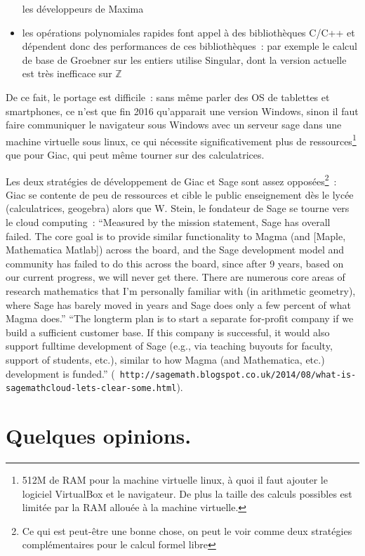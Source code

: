 \documentclass[a4paper,11pt]{article}
\begin{document}
\begin{giacjshere}
\begin{itemize}
les d\'eveloppeurs de Maxima
\item
les op\'erations polynomiales rapides font appel \`a des
biblioth\`eques C/C++ et d\'ependent donc des performances
de ces biblioth\`eques~: par exemple le calcul de base
de Groebner sur les entiers utilise Singular, dont la version
actuelle est tr\`es inefficace sur $\mathbb{Z}$
\end{itemize} 
De ce fait, le portage est difficile~: sans m\^eme parler des OS de tablettes
et smartphones, ce n'est que fin 2016 qu'apparait une version 
Windows, sinon il faut faire communiquer le navigateur sous Windows 
avec un serveur sage dans une machine virtuelle sous linux, ce qui n\'ecessite
significativement plus de ressources\footnote{512M de RAM pour la
machine virtuelle linux, \`a quoi il faut ajouter 
le logiciel VirtualBox et le navigateur. De plus la taille des
calculs possibles est limit\'ee par la RAM allou\'ee \`a
la machine virtuelle.} que pour Giac, 
qui peut m\^eme tourner sur des calculatrices.

Les deux strat\'egies de d\'eveloppement de Giac et Sage
sont assez oppos\'ees\footnote{Ce qui est peut-\^etre une bonne chose,
on peut le voir comme deux strat\'egies compl\'ementaires pour le
calcul formel libre}~: Giac se contente de peu de ressources et cible le 
public enseignement d\`es le lyc\'ee (calculatrices, geogebra) alors
que W. Stein, le fondateur de Sage se tourne vers le cloud computing~:
``Measured by the mission statement, Sage has overall failed. The core
goal is to provide similar functionality to Magma (and [Maple,
Mathematica Matlab]) across the board, and the Sage development model
and community has failed to do this across the board, since after 9
years, based on our current progress, we will never get there. There
are numerous core areas of research mathematics that I'm personally
familiar with (in arithmetic geometry), where Sage has barely moved in
years and Sage does only a few percent of what Magma does.''
``The longterm plan is to start a separate for-profit company if we
build a sufficient customer base. If this company is successful, it
would also support fulltime development of Sage (e.g., via teaching
buyouts for faculty, support of students, etc.), similar to how Magma
(and Mathematica, etc.) development is funded.'' ({\tt \tiny
  http://sagemath.blogspot.co.uk/2014/08/what-is-sagemathcloud-lets-clear-some.html}).

\section{Quelques opinions.}

\end{giacjshere}
\end{document}
